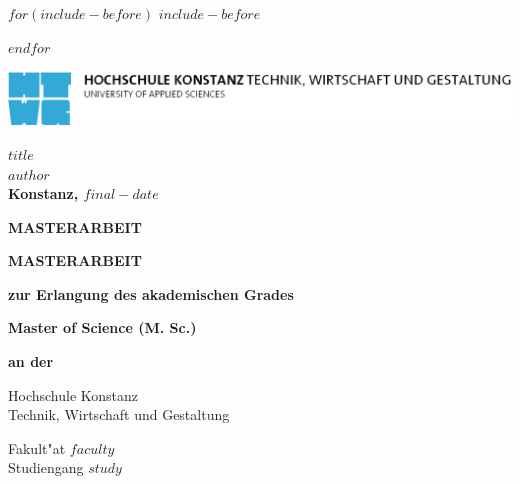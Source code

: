 \documentclass[$if(fontsize)$$fontsize$,$endif$$if(lang)$$babel-lang$,$endif$$if(papersize)$$papersize$paper,$endif$$for(classoption)$$classoption$$sep$,$endfor$]{$documentclass$}
\begin{document}
$for(include-before)$
$include-before$

$endfor$



\begin{singlespace}
\begin{titlepage}

\vspace*{-3.5cm}

\begin{flushleft}
\hspace*{-1cm} \includegraphics[width=15.7cm]{media/htwg-logo.pdf}
\end{flushleft}

\vspace{2.5cm}

\begin{center}
  \huge{
    \textbf{$title$} \\[5cm]
  }
  \Large{
    \textbf{$author$}} \\[6.5cm]
  \large{
    \textbf{Konstanz, $final-date$} \\[2.3cm]
  }
  
  \Huge{
    \textbf{{\sf MASTERARBEIT}}
  }
\end{center}

\end{titlepage}
\setcounter{page}{1}
\newpage

\thispagestyle{empty}
{
\setlength{\parskip}{0.5cm}
        \begin{center}
        \textbf{\huge MASTERARBEIT}

        \textbf{zur Erlangung des akademischen Grades}

        \textbf{\Large Master of Science (M. Sc.)}

        \textbf{an der}

        \textsf{\huge Hochschule Konstanz}\\
        {\small Technik, Wirtschaft und Gestaltung}

        \textsf{\Large Fakult"at $faculty$} \\
        Studiengang $study$
        \end{center}
}
\begin{center}

\vspace*{2cm}


\end{center}
\end{singlespace}
\end{document}
